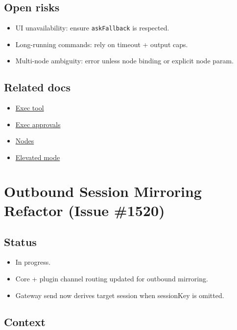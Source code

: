 \subsection{Open risks}


\begin{itemize}
  \item UI unavailability: ensure \texttt{askFallback} is respected.
  \item Long-running commands: rely on timeout + output caps.
  \item Multi-node ambiguity: error unless node binding or explicit node param.
\end{itemize}


\subsection{Related docs}


\begin{itemize}
  \item \href{/tools/exec}{Exec tool}
  \item \href{/tools/exec-approvals}{Exec approvals}
  \item \href{/nodes}{Nodes}
  \item \href{/tools/elevated}{Elevated mode}
\end{itemize}



\clearpage

\section{Outbound Session Mirroring Refactor (Issue \#1520)}


\subsection{Status}


\begin{itemize}
  \item In progress.
  \item Core + plugin channel routing updated for outbound mirroring.
  \item Gateway send now derives target session when sessionKey is omitted.
\end{itemize}


\subsection{Context}


